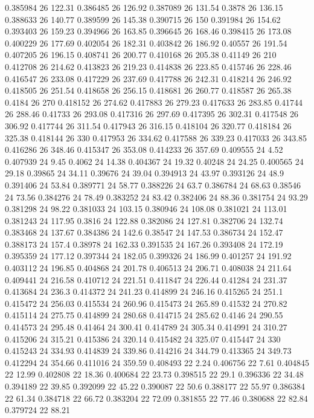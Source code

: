 0.385984 26 122.31
0.386485 26 126.92
0.387089 26 131.54
0.3878 26 136.15
0.388633 26 140.77
0.389599 26 145.38
0.390715 26 150
0.391984 26 154.62
0.393403 26 159.23
0.394966 26 163.85
0.396645 26 168.46
0.398415 26 173.08
0.400229 26 177.69
0.402054 26 182.31
0.403842 26 186.92
0.40557 26 191.54
0.407205 26 196.15
0.408741 26 200.77
0.410168 26 205.38
0.41149 26 210
0.412708 26 214.62
0.413823 26 219.23
0.414838 26 223.85
0.415746 26 228.46
0.416547 26 233.08
0.417229 26 237.69
0.417788 26 242.31
0.418214 26 246.92
0.418505 26 251.54
0.418658 26 256.15
0.418681 26 260.77
0.418587 26 265.38
0.4184 26 270
0.418152 26 274.62
0.417883 26 279.23
0.417633 26 283.85
0.41744 26 288.46
0.41733 26 293.08
0.417316 26 297.69
0.417395 26 302.31
0.417548 26 306.92
0.417744 26 311.54
0.417943 26 316.15
0.418104 26 320.77
0.418184 26 325.38
0.418144 26 330
0.417953 26 334.62
0.417588 26 339.23
0.417033 26 343.85
0.416286 26 348.46
0.415347 26 353.08
0.414233 26 357.69
0.409555 24 4.52
0.407939 24 9.45
0.4062 24 14.38
0.404367 24 19.32
0.40248 24 24.25
0.400565 24 29.18
0.39865 24 34.11
0.39676 24 39.04
0.394913 24 43.97
0.393126 24 48.9
0.391406 24 53.84
0.389771 24 58.77
0.388226 24 63.7
0.386784 24 68.63
0.38546 24 73.56
0.384276 24 78.49
0.383252 24 83.42
0.382406 24 88.36
0.381754 24 93.29
0.381298 24 98.22
0.381033 24 103.15
0.380946 24 108.08
0.381021 24 113.01
0.381243 24 117.95
0.3816 24 122.88
0.382086 24 127.81
0.382706 24 132.74
0.383468 24 137.67
0.384386 24 142.6
0.38547 24 147.53
0.386734 24 152.47
0.388173 24 157.4
0.38978 24 162.33
0.391535 24 167.26
0.393408 24 172.19
0.395359 24 177.12
0.397344 24 182.05
0.399326 24 186.99
0.401257 24 191.92
0.403112 24 196.85
0.404868 24 201.78
0.406513 24 206.71
0.408038 24 211.64
0.409441 24 216.58
0.410712 24 221.51
0.411847 24 226.44
0.41284 24 231.37
0.413684 24 236.3
0.414372 24 241.23
0.414899 24 246.16
0.415265 24 251.1
0.415472 24 256.03
0.415534 24 260.96
0.415473 24 265.89
0.41532 24 270.82
0.415114 24 275.75
0.414899 24 280.68
0.414715 24 285.62
0.4146 24 290.55
0.414573 24 295.48
0.41464 24 300.41
0.414789 24 305.34
0.414991 24 310.27
0.415206 24 315.21
0.415386 24 320.14
0.415482 24 325.07
0.415447 24 330
0.415243 24 334.93
0.414839 24 339.86
0.414216 24 344.79
0.413365 24 349.73
0.412294 24 354.66
0.411016 24 359.59
0.408493 22 2.24
0.406756 22 7.61
0.404845 22 12.99
0.402808 22 18.36
0.400684 22 23.73
0.398515 22 29.1
0.396336 22 34.48
0.394189 22 39.85
0.392099 22 45.22
0.390087 22 50.6
0.388177 22 55.97
0.386384 22 61.34
0.384718 22 66.72
0.383204 22 72.09
0.381855 22 77.46
0.380688 22 82.84
0.379724 22 88.21
